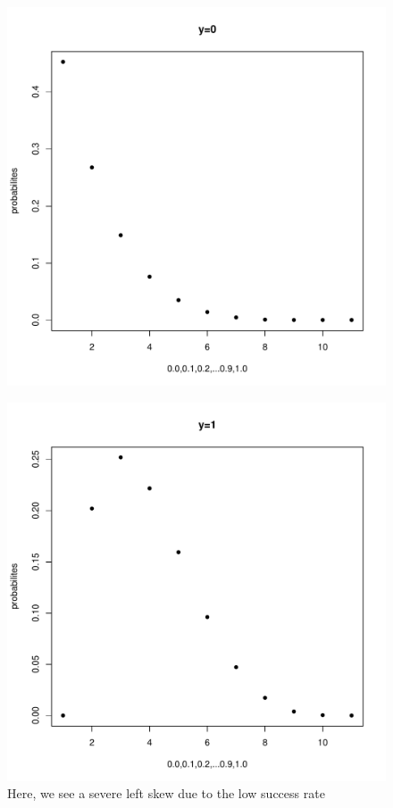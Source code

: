 \documentclass[11pt]{article}
\begin{document}
\begin{enumerate}
\begin{enumerate}
\begin{figure}[H]
		\includegraphics[scale=.6]{y=0graph.pdf}
	\end{figure}
	\begin{figure}[H]
		\centering
		\caption{Here, we see a severe left skew due to the low success rate}
		\includegraphics[scale=.6]{y=1graph.pdf}

\end{figure}
\end{enumerate}
\end{enumerate}
\end{document}
